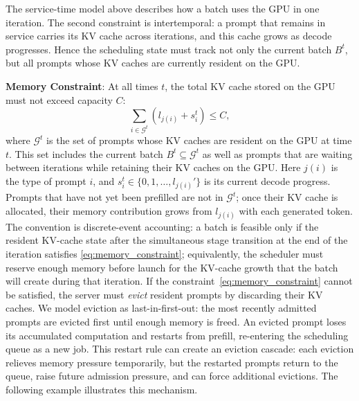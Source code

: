 The service-time model above describes how a batch uses the GPU in one iteration. The second constraint is intertemporal: a prompt that remains in service carries its KV cache across iterations, and this cache grows as decode progresses. Hence the scheduling state must track not only the current batch \(B^t\), but all prompts whose KV caches are currently resident on the GPU.

\textbf{Memory Constraint}: At all times \(t\), the total KV cache stored on the GPU must not exceed capacity \(C\):
\begin{equation}
\label{eq:memory_constraint}
\sum_{i \in \mathcal{G}^t} (l_{j(i)} + s^t_i) \le C,
\end{equation}
where \(\mathcal{G}^t\) is the set of prompts whose KV caches are resident on the GPU at time \(t\). This set includes the current batch \(B^t \subseteq \mathcal{G}^t\) as well as prompts that are waiting between iterations while retaining their KV caches on the GPU. Here \(j(i)\) is the type of prompt \(i\), and \(s_i^t \in \{0,1,\dots,l_{j(i)}'\}\) is its current decode progress. Prompts that have not yet been prefilled are not in \(\mathcal{G}^t\); once their KV cache is allocated, their memory contribution grows from \(l_{j(i)}\) with each generated token. The convention is discrete-event accounting: a batch is feasible only if the resident KV-cache state after the simultaneous stage transition at the end of the iteration satisfies \eqref{eq:memory_constraint}; equivalently, the scheduler must reserve enough memory before launch for the KV-cache growth that the batch will create during that iteration. If the constraint~\eqref{eq:memory_constraint} cannot be satisfied, the server must \textit{evict} resident prompts by discarding their KV caches. We model eviction as last-in-first-out: the most recently admitted prompts are evicted first until enough memory is freed. An evicted prompt loses its accumulated computation and restarts from prefill, re-entering the scheduling queue as a new job. This restart rule can create an eviction cascade: each eviction relieves memory pressure temporarily, but the restarted prompts return to the queue, raise future admission pressure, and can force additional evictions. The following example illustrates this mechanism.

